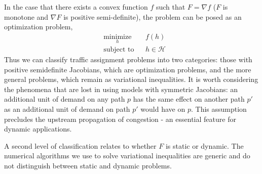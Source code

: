 In the case that there exists a convex function $f$ such that $F=\nabla f$ ($F$ is monotone and $\nabla F$ is positive semi-definite), the problem can be posed as an optimization problem,
\begin{equation}
\label{eq:opt}
\begin{aligned}
& \underset{h}{\text{minimize}}
& & f(h) \\
& \text{subject to}
& & h \in \mathcal{H}
\end{aligned}
\end{equation}
Thus we can classify traffic assignment problems into two  categories: those with positive semidefinite Jacobians, which are optimization problems, and the more general problems, which remain as variational inequalities. It is worth considering the phenomena that are lost in using models with symmetric Jacobians: an additional unit of demand on any path $p$ has the same effect on another path $p'$ as an additional unit of demand on path $p'$ would have on $p$. This assumption precludes the upstream propagation of congestion - an essential feature for dynamic applications.

A second level of classification relates to whether $F$ is static or dynamic. The numerical algorithms we use to solve variational inequalities are generic and do not distinguish between static and dynamic problems.


